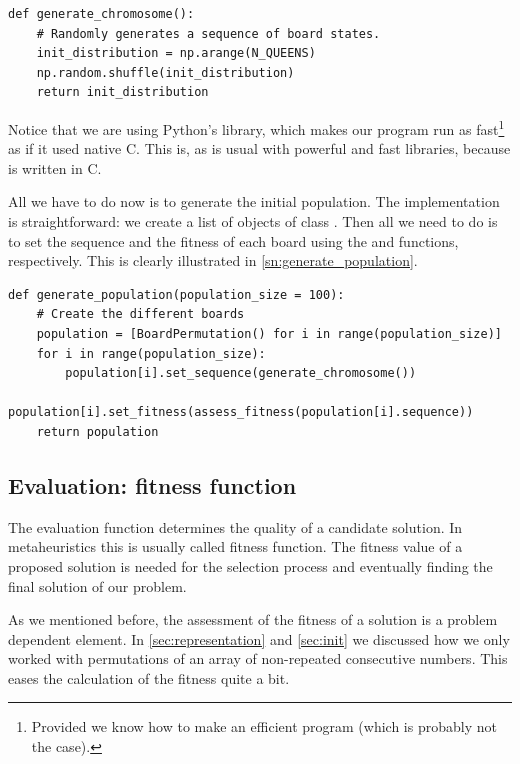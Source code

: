 \begin{lstlisting}[label=sn:generate_chromosome, caption=Function to generate a single individual]
def generate_chromosome():
	# Randomly generates a sequence of board states.
	init_distribution = np.arange(N_QUEENS)
	np.random.shuffle(init_distribution)
	return init_distribution
\end{lstlisting}

Notice that we are using Python's  library, which makes our program run as fast\footnote{Provided we know how to make an efficient program (which is probably not the case).} as if it used native C. This is, as is usual with powerful and fast libraries, because  is written in C.

All we have to do now is to generate the initial population. The implementation is straightforward: we create a list of  objects of class . Then all we need to do is to set the sequence and the fitness of each board using the  and  functions, respectively. This is clearly illustrated in \cref{sn:generate_population}.

\begin{lstlisting}[label=sn:generate_population, caption=Population initialization function]
def generate_population(population_size = 100):
	# Create the different boards
	population = [BoardPermutation() for i in range(population_size)]
	for i in range(population_size):
		population[i].set_sequence(generate_chromosome())
		population[i].set_fitness(assess_fitness(population[i].sequence))
	return population
\end{lstlisting}

\subsection{Evaluation: fitness function}\label{sec:fitness}

The evaluation function determines the quality of a candidate solution. In metaheuristics this is usually called fitness function. The fitness value of a proposed solution is needed for the selection process and eventually finding the final solution of our problem.

As we mentioned before, the assessment of the fitness of a solution is a problem dependent element. In \cref{sec:representation} and \cref{sec:init} we discussed how we only worked with permutations of an array of non-repeated consecutive numbers. This eases the calculation of the fitness quite a bit.


